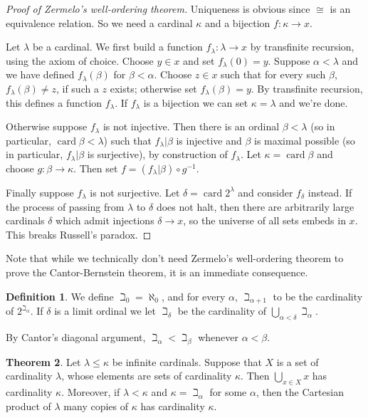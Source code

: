 \documentclass[12pt]{book}
\DeclareMathOperator{\card}{card}
\theoremstyle{definition}
\newtheorem{theorem}{Theorem}[section]
\newtheorem{definition}[theorem]{Definition}
\begin{document}
\begin{proof}[Proof of Zermelo's well-ordering theorem]
Uniqueness is obvious since $\cong$ is an equivalence relation.
So we need a cardinal $\kappa$ and a bijection $f: \kappa \to x$.

Let $\lambda$ be a cardinal. We first build a function $f_\lambda: \lambda \to x$ by transfinite recursion, using the axiom of choice.
Choose $y \in x$ and set $f_\lambda(0) = y$.
Suppose $\alpha < \lambda$ and we have defined $f_\lambda(\beta)$ for $\beta < \alpha$.
Choose $z \in x$ such that for every such $\beta$, $f_\lambda(\beta) \neq z$, if such a $z$ exists; otherwise set $f_\lambda(\beta) = y$.
By transfinite recursion, this defines a function $f_\lambda$. If $f_\lambda$ is a bijection we can set $\kappa = \lambda$ and we're done.

Otherwise suppose $f_\lambda$ is not injective. Then there is an ordinal $\beta < \lambda$ (so in particular, $\card \beta < \lambda$) such that $f_\lambda|\beta$ is injective and $\beta$ is maximal possible (so in particular, $f_\lambda|\beta$ is surjective), by construction of $f_\lambda$.
Let $\kappa = \card \beta$ and choose $g: \beta \to \kappa$.
Then set $f = (f_\lambda|\beta) \circ g^{-1}$.

Finally suppose $f_\lambda$ is not surjective. Let $\delta = \card 2^\lambda$ and consider $f_\delta$ instead.
If the process of passing from $\lambda$ to $\delta$ does not halt, then there are arbitrarily large cardinals $\delta$ which admit injections $\delta \to x$, so the universe of all sets embeds in $x$.
This breaks Russell's paradox.
\end{proof}

Note that while we technically don't need Zermelo's well-ordering theorem to prove the Cantor-Bernstein theorem, it is an immediate consequence.

\begin{definition}
\label{beth dfn}
We define $\beth_0 = \aleph_0$, and for every $\alpha$, $\beth_{\alpha + 1}$ to be the cardinality of $2^{\beth_\alpha}$.
If $\delta$ is a limit ordinal we let $\beth_\delta$ be the cardinality of $\bigcup_{\alpha < \delta} \beth_\alpha$.
\end{definition}

By Cantor's diagonal argument, $\beth_\alpha < \beth_\beta$ whenever $\alpha < \beta$.

\begin{theorem}
\label{cardinal arithmetic trivial}
Let $\lambda \leq \kappa$ be infinite cardinals.
Suppose that $X$ is a set of cardinality $\lambda$, whose elements are sets of cardinality $\kappa$. Then $\bigcup_{x \in X} x$ has cardinality $\kappa$.
Moreover, if $\lambda < \kappa$ and $\kappa = \beth_\alpha$ for some $\alpha$, then the Cartesian product of $\lambda$ many copies of $\kappa$ has cardinality $\kappa$.
\end{theorem}
\end{document}
